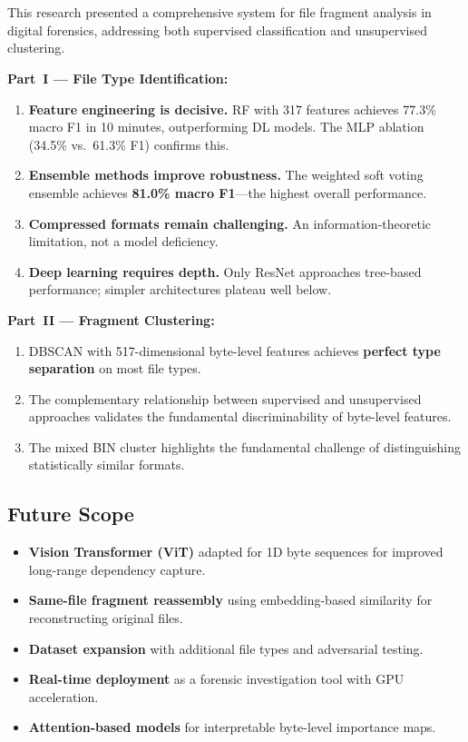 \documentclass[12pt,a4paper]{report}
\begin{document}
\chapter{}
\begin{normalsize}
\noindent
{\setlength{\baselineskip}{1.1\baselineskip}

This research presented a comprehensive system for file fragment analysis in digital forensics, addressing both supervised classification and unsupervised clustering.

\textbf{Part~I --- File Type Identification:}
\begin{enumerate}
    \item \textbf{Feature engineering is decisive.} RF with 317 features achieves 77.3\% macro F1 in 10 minutes, outperforming DL models. The MLP ablation (34.5\% vs.\ 61.3\% F1) confirms this.
    \item \textbf{Ensemble methods improve robustness.} The weighted soft voting ensemble achieves \textbf{81.0\% macro F1}---the highest overall performance.
    \item \textbf{Compressed formats remain challenging.} An information-theoretic limitation, not a model deficiency.
    \item \textbf{Deep learning requires depth.} Only ResNet approaches tree-based performance; simpler architectures plateau well below.
\end{enumerate}

\textbf{Part~II --- Fragment Clustering:}
\begin{enumerate}
    \item DBSCAN with 517-dimensional byte-level features achieves \textbf{perfect type separation} on most file types.
    \item The complementary relationship between supervised and unsupervised approaches validates the fundamental discriminability of byte-level features.
    \item The mixed BIN cluster highlights the fundamental challenge of distinguishing statistically similar formats.
\end{enumerate}

\section*{Future Scope}
\begin{itemize}
    \item \textbf{Vision Transformer (ViT)} adapted for 1D byte sequences for improved long-range dependency capture.
    \item \textbf{Same-file fragment reassembly} using embedding-based similarity for reconstructing original files.
    \item \textbf{Dataset expansion} with additional file types and adversarial testing.
    \item \textbf{Real-time deployment} as a forensic investigation tool with GPU acceleration.
    \item \textbf{Attention-based models} for interpretable byte-level importance maps.
\end{itemize}
\par}
\end{normalsize}
\end{document}

